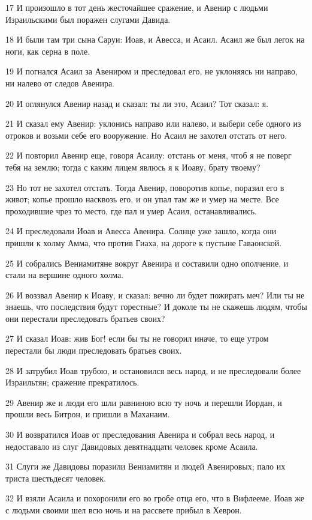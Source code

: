 \par 17 И произошло в тот день жесточайшее сражение, и Авенир с людьми Израильскими был поражен слугами Давида.
\par 18 И были там три сына Саруи: Иоав, и Авесса, и Асаил. Асаил же был легок на ноги, как серна в поле.
\par 19 И погнался Асаил за Авениром и преследовал его, не уклоняясь ни направо, ни налево от следов Авенира.
\par 20 И оглянулся Авенир назад и сказал: ты ли это, Асаил? Тот сказал: я.
\par 21 И сказал ему Авенир: уклонись направо или налево, и выбери себе одного из отроков и возьми себе его вооружение. Но Асаил не захотел отстать от него.
\par 22 И повторил Авенир еще, говоря Асаилу: отстань от меня, чтоб я не поверг тебя на землю; тогда с каким лицем явлюсь я к Иоаву, брату твоему?
\par 23 Но тот не захотел отстать. Тогда Авенир, поворотив копье, поразил его в живот; копье прошло насквозь его, и он упал там же и умер на месте. Все проходившие чрез то место, где пал и умер Асаил, останавливались.
\par 24 И преследовали Иоав и Авесса Авенира. Солнце уже зашло, когда они пришли к холму Амма, что против Гиаха, на дороге к пустыне Гаваонской.
\par 25 И собрались Вениамитяне вокруг Авенира и составили одно ополчение, и стали на вершине одного холма.
\par 26 И воззвал Авенир к Иоаву, и сказал: вечно ли будет пожирать меч? Или ты не знаешь, что последствия будут горестные? И доколе ты не скажешь людям, чтобы они перестали преследовать братьев своих?
\par 27 И сказал Иоав: жив Бог! если бы ты не говорил иначе, то еще утром перестали бы люди преследовать братьев своих.
\par 28 И затрубил Иоав трубою, и остановился весь народ, и не преследовали более Израильтян; сражение прекратилось.
\par 29 Авенир же и люди его шли равниною всю ту ночь и перешли Иордан, и прошли весь Битрон, и пришли в Маханаим.
\par 30 И возвратился Иоав от преследования Авенира и собрал весь народ, и недоставало из слуг Давидовых девятнадцати человек кроме Асаила.
\par 31 Слуги же Давидовы поразили Вениамитян и людей Авенировых; пало их триста шестьдесят человек.
\par 32 И взяли Асаила и похоронили его во гробе отца его, что в Вифлееме. Иоав же с людьми своими шел всю ночь и на рассвете прибыл в Хеврон.

